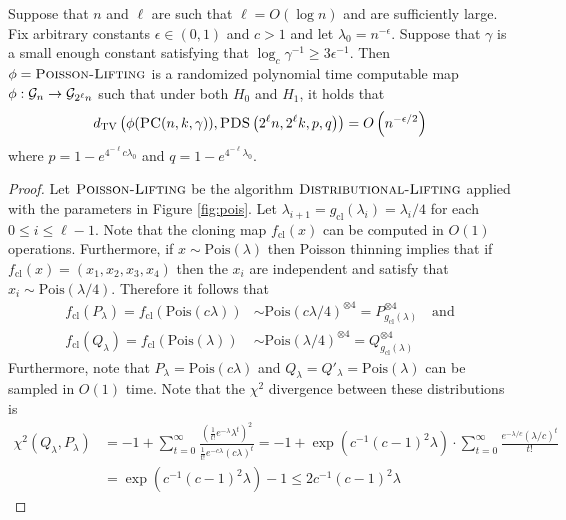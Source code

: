 \begin{lemma} \label{lem:6a}
Suppose that $n$ and $\ell$ are such that $\ell = O(\log n)$ and are sufficiently large. Fix arbitrary constants $\epsilon \in (0, 1)$ and $c > 1$ and let $\lambda_0 = n^{-\epsilon}$. Suppose that $\gamma$ is a small enough constant satisfying that $\log_c \gamma^{-1} \ge 3\epsilon^{-1}$. Then $\phi = \textsc{Poisson-Lifting}$ is a randomized polynomial time computable map $\phi : \mathcal{G}_n \to \mathcal{G}_{2^\ell n}$ such that under both $H_0$ and $H_1$, it holds that
$$d_{\text{TV}}\left( \phi(\textsc{PC}(n, k, \gamma)), \textsc{PDS}\left(2^\ell n, 2^\ell k, p, q \right) \right) = O\left( n^{-\epsilon/2}\right)$$
where $p = 1 - e^{4^{-\ell} c\lambda_0}$ and $q = 1 - e^{4^{-\ell} \lambda_0}$.
\end{lemma}

\begin{proof}
Let $\textsc{Poisson-Lifting}$ be the algorithm $\textsc{Distributional-Lifting}$ applied with the parameters in Figure \ref{fig:pois}. Let $\lambda_{i + 1} = g_{\text{cl}}(\lambda_i) = \lambda_i/4$ for each $0 \le i \le \ell - 1$. Note that the cloning map $f_{\text{cl}}(x)$ can be computed in $O(1)$ operations. Furthermore, if $x \sim \text{Pois}(\lambda)$ then Poisson thinning implies that if $f_{\text{cl}}(x) = (x_1, x_2, x_3, x_4)$ then the $x_i$ are independent and satisfy that $x_i \sim \text{Pois}(\lambda/4)$. Therefore it follows that
\begin{align*}
f_{\text{cl}}(P_\lambda) = f_{\text{cl}}(\text{Pois}(c\lambda)) &\sim \text{Pois}(c\lambda/4)^{\otimes 4} = P_{g_{\text{cl}}(\lambda)}^{\otimes 4} \quad \text{and} \\ 
f_{\text{cl}}(Q_\lambda) = f_{\text{cl}}(\text{Pois}(\lambda)) &\sim \text{Pois}(\lambda/4)^{\otimes 4} = Q_{g_{\text{cl}}(\lambda)}^{\otimes 4}
\end{align*}
Furthermore, note that $P_{\lambda} = \text{Pois}(c\lambda)$ and $Q_{\lambda} = Q'_\lambda = \text{Pois}(\lambda)$ can be sampled in $O(1)$ time. Note that the $\chi^2$ divergence between these distributions is
\begin{align*}
\chi^2\left( Q_{\lambda}, P_\lambda \right) &= -1 + \sum_{t = 0}^\infty \frac{\left( \frac{1}{t!} e^{-\lambda} \lambda^t \right)^2}{\frac{1}{t!} e^{-c\lambda} (c\lambda)^t} = -1 + \exp\left( c^{-1}(c-1)^2 \lambda \right) \cdot \sum_{t = 0}^\infty \frac{e^{-\lambda/c} (\lambda/c)^t}{t!} \\
&= \exp\left( c^{-1}(c-1)^2 \lambda \right) - 1 \le 2c^{-1}(c-1)^2 \lambda
\end{align*}

\end{proof}

